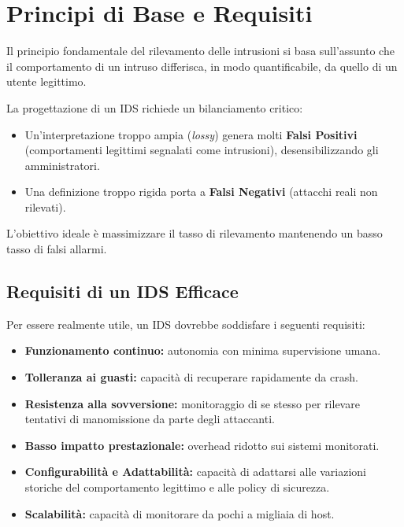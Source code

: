 \section{Principi di Base e Requisiti}

Il principio fondamentale del rilevamento delle intrusioni si basa sull'assunto che il comportamento di un intruso differisca, in modo quantificabile, da quello di un utente legittimo. 

\begin{warnbox}
La progettazione di un IDS richiede un bilanciamento critico:
\begin{itemize}
    \item Un'interpretazione troppo ampia (\textit{lossy}) genera molti \textbf{Falsi Positivi} (comportamenti legittimi segnalati come intrusioni), desensibilizzando gli amministratori.
    \item Una definizione troppo rigida porta a \textbf{Falsi Negativi} (attacchi reali non rilevati).
\end{itemize}
L'obiettivo ideale è massimizzare il tasso di rilevamento mantenendo un basso tasso di falsi allarmi.
\end{warnbox}

\subsection{Requisiti di un IDS Efficace}
Per essere realmente utile, un IDS dovrebbe soddisfare i seguenti requisiti:
\begin{itemize}
    \item \textbf{Funzionamento continuo:} autonomia con minima supervisione umana.
    \item \textbf{Tolleranza ai guasti:} capacità di recuperare rapidamente da crash.
    \item \textbf{Resistenza alla sovversione:} monitoraggio di se stesso per rilevare tentativi di manomissione da parte degli attaccanti.
    \item \textbf{Basso impatto prestazionale:} overhead ridotto sui sistemi monitorati.
    \item \textbf{Configurabilità e Adattabilità:} capacità di adattarsi alle variazioni storiche del comportamento legittimo e alle policy di sicurezza.
    \item \textbf{Scalabilità:} capacità di monitorare da pochi a migliaia di host.
\end{itemize}

